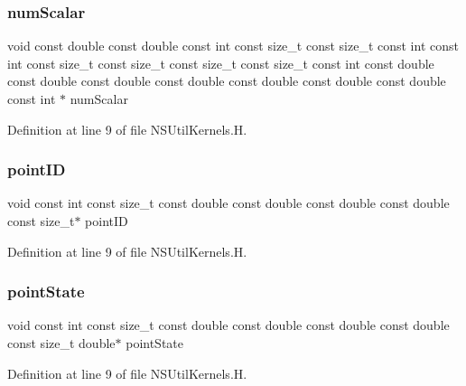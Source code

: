 \subsubsection{\texorpdfstring{num\+Scalar}{numScalar}}
{\footnotesize\ttfamily void const double const double const int const size\+\_\+t const size\+\_\+t const int const int const size\+\_\+t const size\+\_\+t const size\+\_\+t const size\+\_\+t const int const double const double const double const double const double const double const double const int $\ast$ num\+Scalar}



Definition at line 9 of file N\+S\+Util\+Kernels.\+H.

\hypertarget{NSUtilKernels_8H_acde79891dbc4fd8e02d5c1ff00f990a5}{}\label{NSUtilKernels_8H_acde79891dbc4fd8e02d5c1ff00f990a5} 
\subsubsection{\texorpdfstring{point\+ID}{pointID}}
{\footnotesize\ttfamily void const int const size\+\_\+t const double const double const double const double const size\+\_\+t$\ast$ point\+ID}



Definition at line 9 of file N\+S\+Util\+Kernels.\+H.

\hypertarget{NSUtilKernels_8H_afef8a617804a12ae0e3b9a7f8a9cec81}{}\label{NSUtilKernels_8H_afef8a617804a12ae0e3b9a7f8a9cec81} 
\subsubsection{\texorpdfstring{point\+State}{pointState}}
{\footnotesize\ttfamily void const int const size\+\_\+t const double const double const double const double const size\+\_\+t double$\ast$ point\+State}



Definition at line 9 of file N\+S\+Util\+Kernels.\+H.

\hypertarget{NSUtilKernels_8H_a9cf6caceb437dbe5893bc2693f11282a}{}\label{NSUtilKernels_8H_a9cf6caceb437dbe5893bc2693f11282a} 
